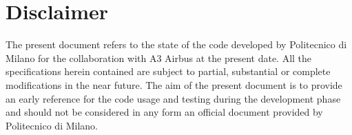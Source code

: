 \chapter*{Disclaimer}
The present document refers to the state of the code developed by
Politecnico di Milano for the collaboration with A3 Airbus at 
the present date. All the specifications herein contained are
subject to partial, substantial or complete modifications in the 
near future. The aim of the present document is to provide an early 
reference for the code usage and testing during the development 
phase and should not be considered in any form an official document
provided by Politecnico di Milano.  
